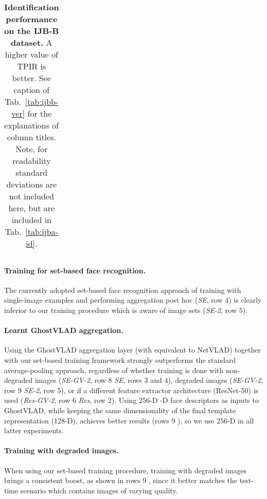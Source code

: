 \documentclass[runningheads]{llncs}
\begin{document}
\begin{table*}[t!]
\begin{center}
{{\begin{tabular}{c|c|c|c|c|c|c|c|c|c|c|c|c}
\hline
\end{tabular}}}
\end{center}
\vspace{-1.5mm}
\caption{\textbf{Identification performance on the IJB-B dataset.} 
A higher value of TPIR is better.
See caption of Tab.~\ref{tab:ijbb-ver} for the explanations of column titles.
Note, for readability  standard 
deviations are not included here, but are included in Tab.~\ref{tab:ijba-id}.
}
\label{tab:ijbb-id}
\vspace{-1cm}
\end{table*}



 

\paragraph{Training for set-based face recognition.}
The currently adopted set-based face recognition approach
of training with single-image examples
and performing aggregation post hoc (\emph{SE}, row 4)
is clearly inferior to
our training procedure which is aware of image sets
(\emph{SE-2}, row 5).


\paragraph{Learnt GhostVLAD aggregation.}
Using the GhostVLAD aggregation layer
(with  \ie equivalent to NetVLAD)
together with our set-based training framework strongly outperforms
the standard average-pooling approach,
regardless of whether training is done with non-degraded images
(\emph{SE-GV-2}, row 8 \vs \emph{SE}, rows 3 and 4),
degraded images
(\emph{SE-GV-2}, row 9 \vs \emph{SE-2}, row 5),
or if a different feature extractor architecture (ResNet-50)
is used (\emph{Res-GV-2}, row 6 \vs \emph{Res}, row 2).
Using 256-D -D face descriptors as inputs to GhostVLAD,
while keeping the same dimensionality of the final template representation
(128-D),
achieves better results (rows 9 ),
so we use 256-D in all latter experiments.

\paragraph{Training with degraded images.}
When using our set-based training procedure,
training with degraded images brings a consistent boost,
as shown in rows 9 , since it better matches the test-time
scenario which contains images of varying quality.
\end{document}
